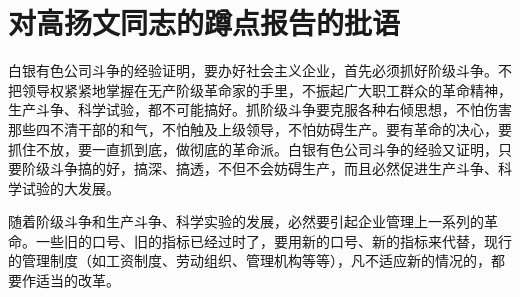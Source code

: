 \section[对高扬文同志的蹲点报告的批语（一九六四年十二月十九日）]{对高扬文同志的蹲点报告的批语}


白银有色公司斗争的经验证明，要办好社会主义企业，首先必须抓好阶级斗争。不把领导权紧紧地掌握在无产阶级革命家的手里，不振起广大职工群众的革命精神，生产斗争、科学试验，都不可能搞好。抓阶级斗争要克服各种右倾思想，不怕伤害那些四不清干部的和气，不怕触及上级领导，不怕妨碍生产。要有革命的决心，要抓住不放，要一直抓到底，做彻底的革命派。白银有色公司斗争的经验又证明，只要阶级斗争搞的好，搞深、搞透，不但不会妨碍生产，而且必然促进生产斗争、科学试验的大发展。

随着阶级斗争和生产斗争、科学实验的发展，必然要引起企业管理上一系列的革命。一些旧的口号、旧的指标已经过时了，要用新的口号、新的指标来代替，现行的管理制度（如工资制度、劳动组织、管理机构等等），凡不适应新的情况的，都要作适当的改革。


